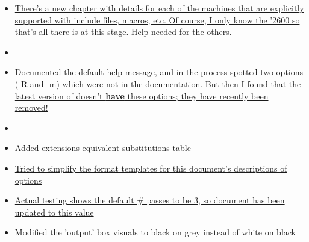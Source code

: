 \begin{itemize}
\item \hyperref[changelog20200901_nop3]{There's a new chapter with details for each of the machines that are explicitly supported with include files, macros, etc. Of course, I only know the '2600 so that's all there is at this stage. Help needed for the others.}
\item[]
\item \hyperref[changelog:20200831help]{Documented the default \dasm help message, and in the process spotted two options (-R and -m) which were not in the documentation. But then I found that the latest version of \dasm doesn't \textbf{have} these options; they have recently been removed!}
\item[]
\item \hyperref[changelog:20200829substitutions]{Added extensions equivalent substitutions table}
\item \hyperref[changelog:20200829formatdescription]{Tried to simplify the format templates for this document's descriptions of options}
\item \hyperref[changelog:20200824passes]{Actual testing shows the default \# passes to be 3, so document has been updated to this value}
\item Modified the 'output' box visuals to black on grey instead of white on black


\end{itemize}
